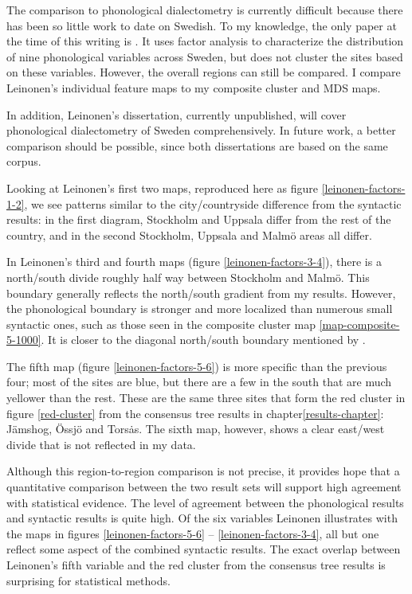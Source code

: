 The comparison to phonological dialectometry is currently difficult
because there has been so little work to date on Swedish. To my
knowledge, the only paper at the time of this writing is
. It uses factor analysis to characterize the
distribution of nine phonological variables across Sweden, but does
not cluster the sites based on these variables. However, the overall
regions can still be compared. I compare Leinonen's
individual feature maps to my composite cluster and MDS maps.

In addition, Leinonen's dissertation, currently unpublished, will
cover phonological dialectometry of Sweden comprehensively. In future
work, a better comparison should be possible, since both dissertations
are based on the same corpus.

Looking at Leinonen's first two maps, reproduced here as figure
\ref{leinonen-factors-1-2}, we see patterns similar to the
city/countryside difference from the syntactic results: in the first diagram,
Stockholm and Uppsala differ from the rest of the country, and in the
second Stockholm, Uppsala and Malm\"o areas all differ.

In Leinonen's third and fourth maps (figure \ref{leinonen-factors-3-4}),
there is a north/south divide roughly half way between Stockholm and
Malm\"o. This boundary generally reflects the north/south
gradient from my results. However, the phonological boundary is stronger and more
localized than numerous small syntactic ones, such as those seen in
the composite cluster map \ref{map-composite-5-1000}. It is closer to
the diagonal north/south boundary mentioned by .

The fifth map (figure \ref{leinonen-factors-5-6}) is more specific
than the previous four; most of the sites are blue, but there are a
few in the south that are much yellower than the rest. These are the
same three sites that form the red cluster in figure \ref{red-cluster}
from the consensus tree results in chapter\ref{results-chapter}:
J\"amshog, \"Ossj\"o and Tors\.as. The sixth map, however, shows a
clear east/west divide that is not reflected in my data.

Although this region-to-region comparison is not precise, it provides
hope that a quantitative comparison between the two result sets will
support high agreement with statistical evidence. The level of
agreement between the phonological results and syntactic results is
quite high. Of the six variables Leinonen illustrates with the maps in
figures \ref{leinonen-factors-5-6} -- \ref{leinonen-factors-3-4}, all
but one reflect some aspect of the combined syntactic results. The
exact overlap between Leinonen's fifth variable and the red cluster
from the consensus tree results is surprising for statistical methods.

